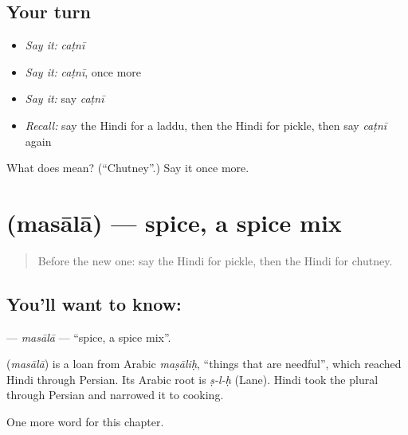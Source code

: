 \subsection*{Your turn}
\begin{itemize}
\raggedright
  \item \emph{Say it:} \emph{caṭnī}
  \item \emph{Say it:} \emph{caṭnī}, once more
  \item \emph{Say it:} say \emph{caṭnī}
  \item \emph{Recall:} say the Hindi for a laddu, then the Hindi for pickle, then say \emph{caṭnī} again
\end{itemize}

\begin{tcolorbox}[breakable,colback=teal!4,colframe=teal!35!black,title={Before you move on}]
What does  mean? (\textquotedblleft{}Chutney\textquotedblright{}.) Say it once more.
\end{tcolorbox}
\section[\texorpdfstring{\hi{मसाला} (masālā)}{मसाला (masālā)}]{ (masālā) — spice, a spice mix}

\label{lesson:HI-C211-masala}



\begin{quote}
Before the new one: say the Hindi for pickle, then the Hindi for chutney.
\end{quote}

\subsection*{You'll want to know: }
\textbf{} — \emph{masālā} — \textquotedblleft{}spice, a spice mix\textquotedblright{}.

\begin{cousinweb}
\textbf{} (\emph{masālā}) is a loan from Arabic \emph{maṣāliḥ}, \textquotedblleft{}things that are needful\textquotedblright{}, which reached Hindi through Persian. Its Arabic root is \emph{ṣ-l-ḥ} (Lane). Hindi took the plural through Persian and narrowed it to cooking.
\end{cousinweb}

\begin{grammarlens}[title={What you've built}]
One more word for this chapter.
\end{grammarlens}

